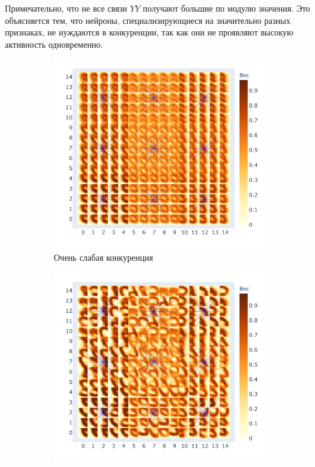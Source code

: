 \documentclass[a4paper]{article}
\begin{document}
Примечательно, что не все связи $YY$ получают большие по модулю значения. Это объясняется тем, что нейроны, специализирующиеся на значительно разных признаках, не нуждаются в конкуренции, так как они не проявляют высокую активность одновременно.

\begin{figure}[H]
\centering
\begin{subfigure}{0.45\textwidth}
    \includegraphics[width=\textwidth,keepaspectratio=true]{competition_on_XY_worst_ru.pdf}
    \caption{Очень слабая конкуренция}
\end{subfigure}
\begin{subfigure}{0.45\textwidth}
    \includegraphics[width=\textwidth,keepaspectratio=true]{competition_on_XY_medium_bad_ru.pdf}

\end{subfigure}
\end{figure}
\end{document}
